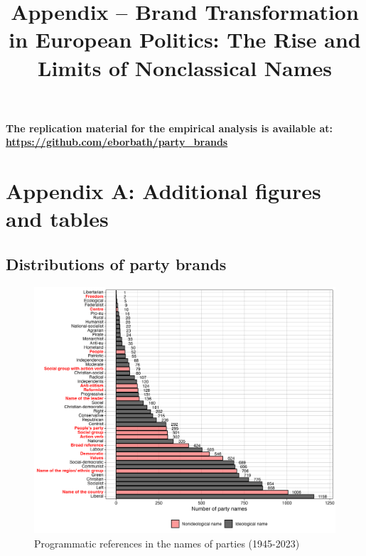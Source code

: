 \documentclass[12pt]{article}
\title{Appendix -- Brand Transformation in European Politics: The Rise and Limits of Nonclassical Names}
\date{}
\begin{document}
\sloppy

\begin{titlepage}
\begin{minipage}{\textwidth}
\maketitle
\thispagestyle{empty}
\setcounter{tocdepth}{2}
\tableofcontents
\vspace*{2cm}
\begin{center}
\textbf{The replication material for the empirical analysis is available at: \url{https://github.com/eborbath/party_brands}}
\end{center}
\end{minipage}
\end{titlepage}

\section{Appendix A: Additional figures and tables}

\subsection{Distributions of party brands}

\begin{figure}[H]
\includegraphics[width=\textwidth]{./Figures/ideology_types.png}
\caption{Programmatic references in the names of parties (1945-2023)}
\end{figure}
\end{document}
